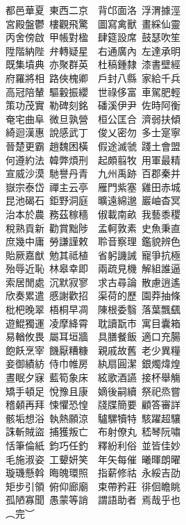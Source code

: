\documentclass[a4paper,twocolumn]{article}
\begin{document}
\begin{Large}
都邑華夏\ 東西二京　背邙面洛\ 浮渭據涇\\
宮殿盤鬱\ 樓觀飛驚　圖寫禽獸\ 畫綵仙靈\\
丙舍傍啟\ 甲帳對楹　肆筵設席\ 鼓瑟吹笙\\
陞階納陛\ 弁轉疑星　右通廣內\ 左達承明\\
既集墳典\ 亦聚群英　杜稿鍾隸\ 漆書壁經\\
府羅將相\ 路俠槐卿　戶封八縣\ 家給千兵\\
高冠陪輦\ 驅轂振纓　世祿侈富\ 車駕肥輕\\
策功茂實\ 勒碑刻銘　磻溪伊尹\ 佐時阿衡\\
奄宅曲阜\ 微旦孰營　桓公匡合\ 濟弱扶傾\\
綺迴漢惠\ 說感武丁　俊乂密勿\ 多士寔寧\\
晉楚更霸\ 趙魏困橫　假途滅虢\ 踐土會盟\\
何遵約法\ 韓弊煩刑　起頗翦牧\ 用軍最精\\
宣威沙漠\ 馳譽丹青　九州禹跡\ 百郡秦并\\
嶽宗泰岱\ 禪主云亭　雁門紫塞\ 雞田赤城\\
昆池碣石\ 鉅野洞庭　曠遠綿邈\ 巖岫杳冥\\

治本於農\ 務茲稼穡　俶載南畝\ 我藝黍稷\\
稅熟貢新\ 勸賞黜陟　孟軻敦素\ 史魚秉直\\
庶幾中庸\ 勞謙謹敕　聆音察理\ 鑑貌辨色\\
貽厥嘉猷\ 勉其祗植　省躬譏誡\ 寵爭抗極\\
殆辱近恥\ 林皋幸即　兩疏見機\ 解組誰逼\\
索居閒處\ 沉默寂寥　求古尋論\ 散慮逍遙\\
欣奏累遣\ 慼謝歡招　渠荷的歷\ 園莽抽條\\
枇杷晚翠\ 梧桐早凋　陳根委翳\ 落葉飄颻\\
遊鯤獨運\ 凌摩絳霄　耽讀翫市\ 寓目囊箱\\
易輶攸畏\ 屬耳垣牆　具膳餐飯\ 適口充腸\\
飽飫烹宰\ 饑厭糟糠　親戚故舊\ 老少異糧\\
妾御績紡\ 侍巾帷房　紈扇圓潔\ 銀燭煒煌\\
晝眠夕寐\ 藍筍象床　絃歌酒讌\ 接杯舉觴\\
矯手頓足\ 悅豫且康　嫡後嗣續\ 祭祀烝嘗\\
稽顙再拜\ 悚懼恐惶　牋牒簡要\ 顧答審詳\\
骸垢想浴\ 執熱願涼　驢騾犢特\ 駭躍超驤\\
誅斬賊盜\ 捕獲叛亡　布射僚丸\ 嵇琴阮嘯\\
恬筆倫紙\ 鈞巧任釣　釋紛利俗\ 並皆佳妙\\
毛施淑姿\ 工顰妍笑　年矢每催\ 曦暉朗曜\\
璇璣懸斡\ 晦魄環照　指薪修祜\ 永綏吉劭\\
矩步引領\ 俯仰廊廟　束帶矜莊\ 徘佪瞻眺\\
孤陋寡聞\ 愚蒙等誚　謂語助者\ 焉哉乎也\\
︵完︶

\end{Large}
\end{document}
